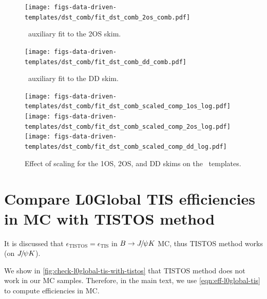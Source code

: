 \begin{figure}[htb]
    \centering
    \texttt{[image: figs-data-driven-templates/dst\_comb/fit\_dst\_comb\_2os\_comb.pdf]}
    \caption{
        \DstComb\ auxiliary fit to the 2OS skim.
    }
    \label{fig:dst-comb-fit-2os}
\end{figure}

\begin{figure}[htb]
    \centering
    \texttt{[image: figs-data-driven-templates/dst\_comb/fit\_dst\_comb\_dd\_comb.pdf]}
    \caption{
        \DstComb\ auxiliary fit to the DD skim.
    }
    \label{fig:dst-comb-fit-dd}
\end{figure}

\begin{figure}[htb]
    \centering
    \texttt{[image: figs-data-driven-templates/dst\_comb/fit\_dst\_comb\_scaled\_comp\_1os\_log.pdf]}
    \texttt{[image: figs-data-driven-templates/dst\_comb/fit\_dst\_comb\_scaled\_comp\_2os\_log.pdf]}
    \texttt{[image: figs-data-driven-templates/dst\_comb/fit\_dst\_comb\_scaled\_comp\_dd\_log.pdf]}

    \caption{
        Effect of scaling for the 1OS, 2OS, and DD skims on the \DstComb\
        templates.
    }
    \label{fig:dst-comb-scale-other-skims}
\end{figure}


\section{Compare L0Global TIS efficiencies in MC with TISTOS method}
\label{appx:suppl:l0global-tis}

It is discussed that
$\epsilon_\text{TISTOS} = \epsilon_\text{TIS}$ in $B \rightarrow {\ensuremath{{J\mskip -3mu/\mskip -2mu\psi}}} K$ MC,
thus TISTOS method works (on ${{J\mskip -3mu/\mskip -2mu\psi}} K$).

We show in \cref{fig:check-l0global-tis-with-tistos} that TISTOS method does not
work in our MC samples.
Therefore, in the main text, we use \cref{eqn:eff-l0global-tis} to compute
efficiencies in MC.

